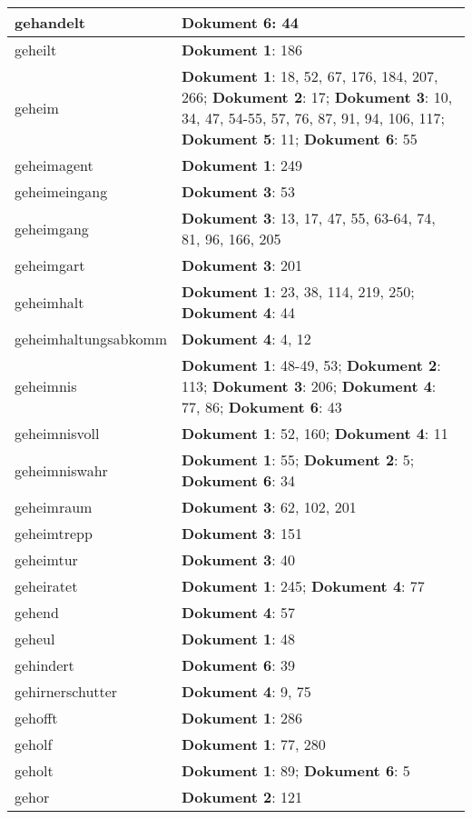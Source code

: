 \documentclass[a5paper]{article}
\begin{document}
\begin{longtable}[l]{|l|p{3in}|}
\hline
gehandelt & \textbf{Dokument 6}: 44 \\
\hline
geheilt & \textbf{Dokument 1}: 186 \\
\hline
geheim & \textbf{Dokument 1}: 18, 52, 67, 176, 184, 207, 266; \textbf{Dokument 2}: 17; \textbf{Dokument 3}: 10, 34, 47, 54-55, 57, 76, 87, 91, 94, 106, 117; \textbf{Dokument 5}: 11; \textbf{Dokument 6}: 55 \\
\hline
geheimagent & \textbf{Dokument 1}: 249 \\
\hline
geheimeingang & \textbf{Dokument 3}: 53 \\
\hline
geheimgang & \textbf{Dokument 3}: 13, 17, 47, 55, 63-64, 74, 81, 96, 166, 205 \\
\hline
geheimgart & \textbf{Dokument 3}: 201 \\
\hline
geheimhalt & \textbf{Dokument 1}: 23, 38, 114, 219, 250; \textbf{Dokument 4}: 44 \\
\hline
geheimhaltungsabkomm & \textbf{Dokument 4}: 4, 12 \\
\hline
geheimnis & \textbf{Dokument 1}: 48-49, 53; \textbf{Dokument 2}: 113; \textbf{Dokument 3}: 206; \textbf{Dokument 4}: 77, 86; \textbf{Dokument 6}: 43 \\
\hline
geheimnisvoll & \textbf{Dokument 1}: 52, 160; \textbf{Dokument 4}: 11 \\
\hline
geheimniswahr & \textbf{Dokument 1}: 55; \textbf{Dokument 2}: 5; \textbf{Dokument 6}: 34 \\
\hline
geheimraum & \textbf{Dokument 3}: 62, 102, 201 \\
\hline
geheimtrepp & \textbf{Dokument 3}: 151 \\
\hline
geheimtur & \textbf{Dokument 3}: 40 \\
\hline
geheiratet & \textbf{Dokument 1}: 245; \textbf{Dokument 4}: 77 \\
\hline
gehend & \textbf{Dokument 4}: 57 \\
\hline
geheul & \textbf{Dokument 1}: 48 \\
\hline
gehindert & \textbf{Dokument 6}: 39 \\
\hline
gehirnerschutter & \textbf{Dokument 4}: 9, 75 \\
\hline
gehofft & \textbf{Dokument 1}: 286 \\
\hline
geholf & \textbf{Dokument 1}: 77, 280 \\
\hline
geholt & \textbf{Dokument 1}: 89; \textbf{Dokument 6}: 5 \\
\hline
gehor & \textbf{Dokument 2}: 121 \\

\end{longtable}
\end{document}
